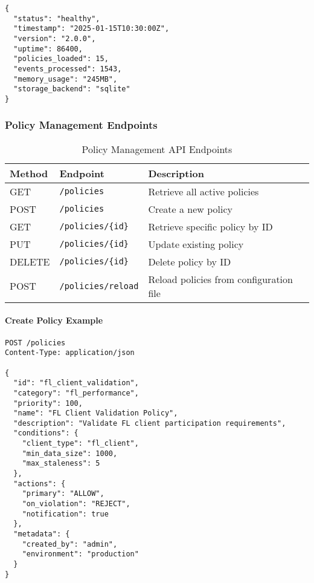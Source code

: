 \begin{lstlisting}[style=jsoncode, caption=Policy Engine Health Check Response]
{
  "status": "healthy",
  "timestamp": "2025-01-15T10:30:00Z",
  "version": "2.0.0",
  "uptime": 86400,
  "policies_loaded": 15,
  "events_processed": 1543,
  "memory_usage": "245MB",
  "storage_backend": "sqlite"
}
\end{lstlisting}

\subsubsection{Policy Management Endpoints}

\begin{table}[H]
\centering
\caption{Policy Management API Endpoints}
\label{tab:policy-management-api}
\begin{tabularx}{\textwidth}{@{}llX@{}}
\toprule
\textbf{Method} & \textbf{Endpoint} & \textbf{Description} \\
\midrule
GET & \texttt{/policies} & Retrieve all active policies \\
POST & \texttt{/policies} & Create a new policy \\
GET & \texttt{/policies/\{id\}} & Retrieve specific policy by ID \\
PUT & \texttt{/policies/\{id\}} & Update existing policy \\
DELETE & \texttt{/policies/\{id\}} & Delete policy by ID \\
POST & \texttt{/policies/reload} & Reload policies from configuration file \\
\bottomrule
\end{tabularx}
\end{table}

\paragraph{Create Policy Example}

\begin{lstlisting}[style=jsoncode, caption=Create Policy Request]
POST /policies
Content-Type: application/json

{
  "id": "fl_client_validation",
  "category": "fl_performance",
  "priority": 100,
  "name": "FL Client Validation Policy",
  "description": "Validate FL client participation requirements",
  "conditions": {
    "client_type": "fl_client",
    "min_data_size": 1000,
    "max_staleness": 5
  },
  "actions": {
    "primary": "ALLOW",
    "on_violation": "REJECT",
    "notification": true
  },
  "metadata": {
    "created_by": "admin",
    "environment": "production"
  }
}
\end{lstlisting}

